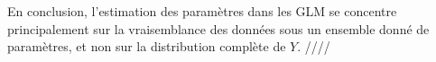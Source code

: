 \documentclass[../main.tex]{subfiles}
\begin{document}
\begin{CJK*}{UTF8}{gbsn}
\begin{enumerate}
\end{enumerate}
En conclusion, l'estimation des paramètres dans les GLM se concentre principalement 
sur la vraisemblance des données sous un ensemble donné de paramètres, 
et non sur la distribution complète de \( Y \). ////

\end{CJK*}
\end{document}
